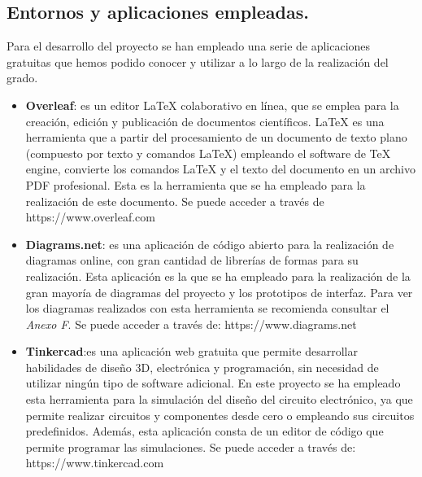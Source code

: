 \subsection{Entornos y aplicaciones empleadas.}
Para el desarrollo del proyecto se han empleado una serie de aplicaciones gratuitas que hemos podido conocer y utilizar a lo largo de la realización del grado. 
\begin{itemize}
\item \textbf{Overleaf}\cite{Overleaf}: es un editor LaTeX colaborativo en línea, que se emplea para la creación, edición y publicación de documentos científicos. LaTeX es una herramienta que a partir del procesamiento de un documento de texto plano (compuesto por texto y comandos LaTeX) empleando el software de TeX engine, convierte los comandos LaTeX y el texto del documento en un archivo PDF profesional. Esta es la herramienta que se ha empleado para la realización de este documento. Se puede acceder a través de https://www.overleaf.com  %

\item \textbf{Diagrams.net}\cite{Diagrams.net}: es una aplicación de código abierto para la realización de diagramas online, con gran cantidad de librerías de formas para su realización. Esta aplicación es la que se ha empleado para la realización de la gran mayoría de diagramas del proyecto y los prototipos de interfaz. Para ver los diagramas realizados con esta herramienta se recomienda consultar el \textit{Anexo F}. Se puede acceder a través de: https://www.diagrams.net %

\item \textbf{Tinkercad}\cite{Tinkercad}:es una aplicación web gratuita que permite desarrollar habilidades de diseño 3D, electrónica y programación, sin necesidad de utilizar ningún tipo de software adicional. En este proyecto se ha empleado esta herramienta para la simulación del diseño del circuito electrónico, ya que permite realizar circuitos y componentes desde cero o empleando sus circuitos predefinidos. Además, esta aplicación consta de un editor de código que permite programar las simulaciones. Se puede acceder a través de: https://www.tinkercad.com %


\end{itemize}
